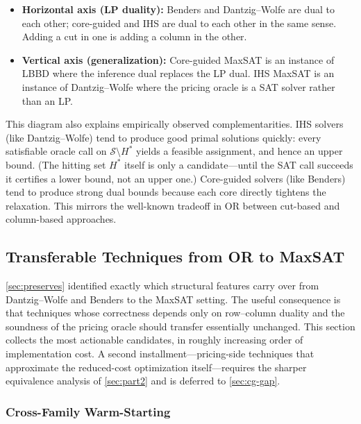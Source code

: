 \begin{itemize}
\item \textbf{Horizontal axis (LP duality):} Benders and Dantzig--Wolfe are
dual to each other; core-guided and IHS are dual to each other in the same
sense. Adding a cut in one is adding a column in the other.
\item \textbf{Vertical axis (generalization):} Core-guided MaxSAT is an
instance of LBBD where the inference dual replaces the LP dual. IHS MaxSAT
is an instance of Dantzig--Wolfe where the pricing oracle is a SAT solver
rather than an LP.
\end{itemize}

This diagram also explains empirically observed complementarities. IHS solvers
(like Dantzig--Wolfe) tend to produce good primal solutions quickly: every
satisfiable oracle call on $\mathcal{S} \setminus H^*$ yields a feasible
assignment, and hence an upper bound. (The hitting set $H^*$ itself is only a
candidate---until the SAT call succeeds it certifies a lower bound, not an
upper one.) Core-guided
solvers (like Benders) tend to produce strong dual bounds because each core
directly tightens the relaxation. This mirrors the well-known tradeoff in
OR between cut-based and column-based approaches.

\subsection{Transferable Techniques from OR to MaxSAT}
\label{sec:techniques}

\cref{sec:preserves} identified exactly which structural features carry
over from Dantzig--Wolfe and Benders to the MaxSAT setting. The useful
consequence is that techniques whose correctness depends only on row--column
duality and the soundness of the pricing oracle should transfer essentially
unchanged. This section collects the most actionable candidates, in roughly
increasing order of implementation cost. A second installment---pricing-side
techniques that approximate the reduced-cost optimization itself---requires
the sharper equivalence analysis of \cref{sec:part2} and is deferred to
\cref{sec:cg-gap}.

\subsubsection{Cross-Family Warm-Starting}

